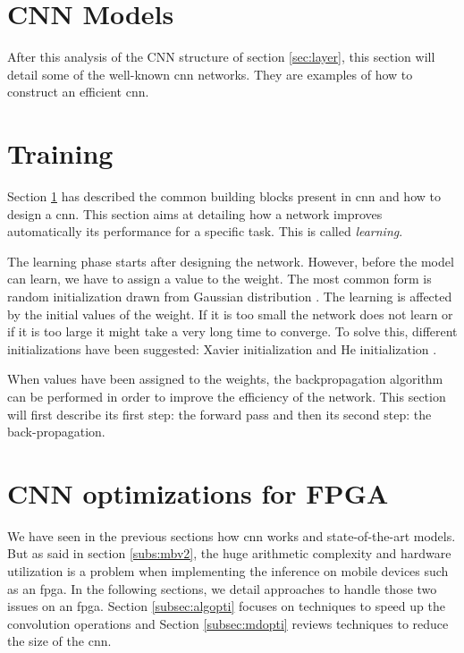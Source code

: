 \section{CNN Models} \label{sec:models}
After this analysis of the CNN structure of section \ref{sec:layer}, this section will detail some of the well-known \acrshort{cnn} networks. They are examples of how to construct an efficient \acrshort{cnn}.

%

%
%
\section{Training} \label{sec:train}
Section \ref{sec:models} has described the common building blocks present in \acrshort{cnn} and how to design a \acrshort{cnn}. This section aims at detailing how a network improves automatically its performance for a specific task. This is called \textit{learning}.

The learning phase starts after designing the network. However, before the model can learn, we have to assign a value to the weight. The most common form is random initialization drawn from Gaussian distribution \cite{he_delving_2015}. The learning is affected by the initial values of the weight. If it is too small the network does not learn or if it is too large it might take a very long time to converge. To solve this, different initializations have been suggested: Xavier initialization \cite{glorot_understanding_2010} and He initialization \cite{he_delving_2015}.

When values have been assigned to the weights, the backpropagation algorithm can be performed in order to improve the efficiency of the network. This section will first describe its first step: the forward pass and then its second step: the back-propagation. 
%

%

%
%
\section{CNN optimizations for FPGA} \label{sec:opti_cnn}
%
%
We have seen in the previous sections how \acrshort{cnn} works and state-of-the-art models. But as said in section \ref{subs:mbv2}, the huge arithmetic complexity and hardware utilization is a problem when implementing the inference on mobile devices such as an \acrshort{fpga}. In the following sections, we detail approaches to handle those two issues on an \acrshort{fpga}. Section \ref{subsec:algopti} focuses on techniques to speed up the convolution operations and Section \ref{subsec:mdopti} reviews techniques to reduce the size of the \acrshort{cnn}.
%

%



